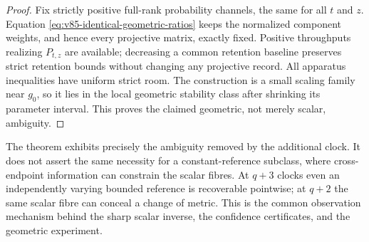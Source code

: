 \begin{proof}
Fix strictly positive full-rank probability channels, the same for
all $t$ and $z$. Equation \eqref{eq:v85-identical-geometric-ratios}
keeps the normalized component weights, and hence every projective
matrix, exactly fixed. Positive throughputs realizing $P_{t,z}$ are
available; decreasing a common retention baseline preserves strict
retention bounds without changing any projective record. All apparatus
inequalities have uniform strict room. The construction is a small
scaling family near $g_0$, so it lies in the local geometric stability
class after shrinking its parameter interval. This proves the claimed
geometric, not merely scalar, ambiguity.
\end{proof}
The theorem exhibits precisely the ambiguity removed by the additional
clock. It does not assert the same necessity for a constant-reference
subclass, where cross-endpoint information can constrain the scalar
fibres. At $q+3$ clocks even an independently varying bounded reference
is recoverable pointwise; at $q+2$ the same scalar fibre can conceal a
change of metric. This is the common observation mechanism behind the
sharp scalar inverse, the confidence certificates, and the geometric
experiment.
